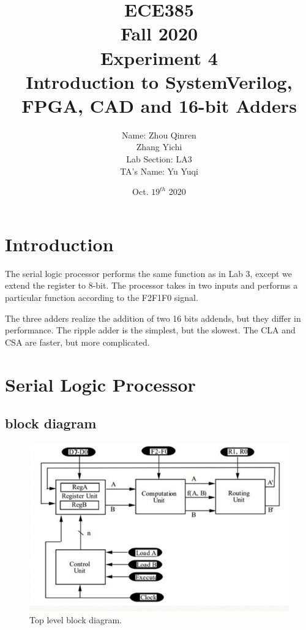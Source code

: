 \documentclass[12pt]{article}
\title{
    \textbf{\Huge ECE385} \\
    \huge Fall 2020 \\
    \huge Experiment 4 \\[120pt]
    \textbf{\Huge Introduction to SystemVerilog, FPGA, CAD and 16-bit Adders} \\[120pt]
    }
\author{
    \large Name: Zhou Qinren \\ 
            \quad\qquad Zhang Yichi \\
    \large Lab Section: LA3 \\
    \large TA's Name: Yu Yuqi
    }
\date{Oct. $19^{th}$ 2020}
\begin{document}
\setlength{\parindent}{0pt}
\maketitle
\newpage

\section{Introduction}
The serial logic processor performs the same function as in Lab 3, except we extend the register to 8-bit. The processor takes in two inputs and performs a particular function according to the F2F1F0 signal.

The three adders realize the addition of two 16 bits addends, but they differ in performance. The ripple adder is the simplest, but the slowest. The CLA and CSA are faster, but more complicated. 


\section{Serial Logic Processor}
\subsection{block diagram}
\begin{figure}[H]
    \centering
    \includegraphics{toplevel_block_diagram.png}
    \caption{Top level block diagram.}
\end{figure}
\end{document}
